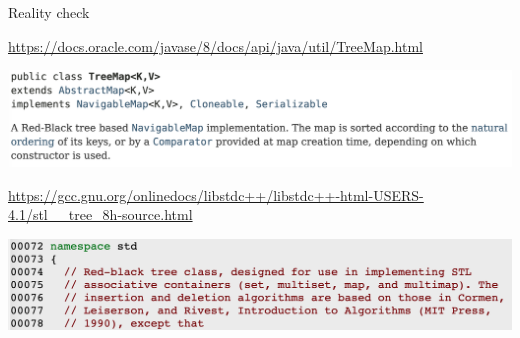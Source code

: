 \begin{frame}{Reality check}

\vspace{-9pt}
\begin{myboxtitle}
\tiny
\url{https://docs.oracle.com/javase/8/docs/api/java/util/TreeMap.html}

\smallskip
\includegraphics[width=\linewidth]{treemap.png}
\vspace{-9pt}
\end{myboxtitle}

\begin{myboxtitle}[C++ STL]
\tiny
\url{https://gcc.gnu.org/onlinedocs/libstdc++/libstdc++-html-USERS-4.1/stl__tree_8h-source.html}

\smallskip
\includegraphics[width=\linewidth]{stl.png}
\vspace{-9pt}
\end{myboxtitle}

\end{frame}


